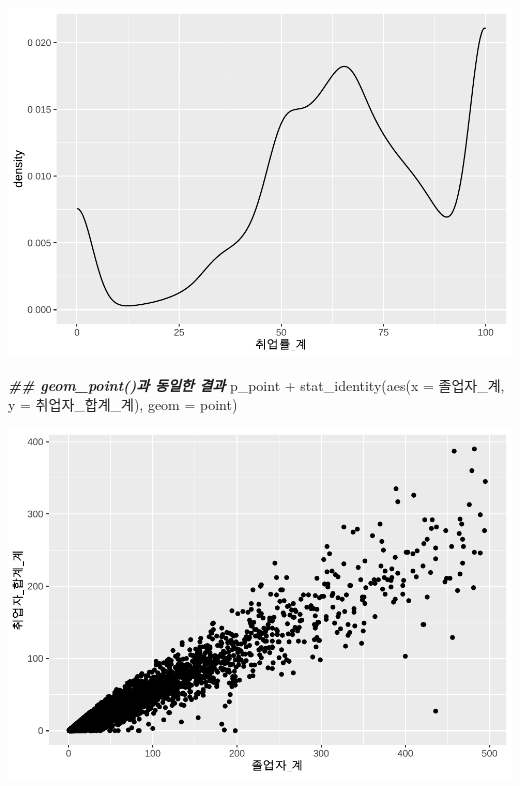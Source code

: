 \documentclass[
]{article}
\newenvironment{Shaded}{\begin{snugshade}}{\end{snugshade}}
\newcommand{\AttributeTok}[1]{\textcolor[rgb]{0.77,0.63,0.00}{#1}}
\newcommand{\DocumentationTok}[1]{\textcolor[rgb]{0.56,0.35,0.01}{\textbf{\textit{#1}}}}
\newcommand{\FunctionTok}[1]{\textcolor[rgb]{0.00,0.00,0.00}{#1}}
\newcommand{\NormalTok}[1]{#1}
\newcommand{\SpecialCharTok}[1]{\textcolor[rgb]{0.00,0.00,0.00}{#1}}
\newcommand{\StringTok}[1]{\textcolor[rgb]{0.31,0.60,0.02}{#1}}
\begin{document}
\includegraphics{chap3_files/figure-latex/unnamed-chunk-51-3.pdf}

\begin{Shaded}
\begin{Highlighting}[]
\DocumentationTok{\#\# geom\_point()과 동일한 결과}
\NormalTok{p\_point }\SpecialCharTok{+} \FunctionTok{stat\_identity}\NormalTok{(}\FunctionTok{aes}\NormalTok{(}\AttributeTok{x =}\NormalTok{ 졸업자\_계, }\AttributeTok{y =}\NormalTok{ 취업자\_합계\_계), }\AttributeTok{geom =} \StringTok{\textquotesingle{}point\textquotesingle{}}\NormalTok{)}
\end{Highlighting}
\end{Shaded}

\includegraphics{chap3_files/figure-latex/unnamed-chunk-51-4.pdf}
\end{document}
